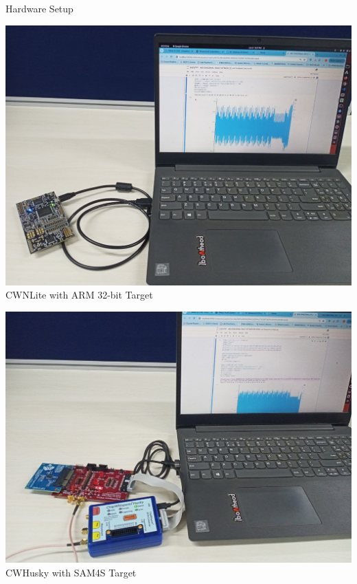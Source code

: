 \documentclass{beamer}
\newenvironment{tres important}[2][]{
	\setkeys{EmphEqEnv}{#2}
	\setkeys{EmphEqOpt}{box={\setlength{\fboxsep}{10pt}\fcolorbox{myNewColorA}{white}},#1}
	\EmphEqMainEnv}
{\endEmphEqMainEnv}
\begin{document}
\begin{frame}{Hardware Setup}
  \centering
  \begin{minipage}[b]{0.3\linewidth}
    \centering
    \includegraphics[width=\linewidth]{images/cwlite_hardware.png}
    \smallskip
    CWNLite with ARM 32-bit Target
  \end{minipage}
  \hfill
  \begin{minipage}[b]{0.3\linewidth}
    \centering
    \includegraphics[width=\linewidth]{images/cwhusky_hardware.png}
    \smallskip
   CWHusky with SAM4S Target
  \end{minipage}
  \hfill
  \begin{minipage}[b]{0.3\linewidth}
    \centering

\end{minipage}
\end{frame}
\end{document}
